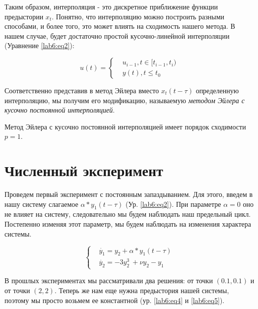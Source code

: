 Таким образом, интерполяция - это дискретное приближение
функции предыстории $x_t$. Понятно, что интерполяцию можно
построить разными способами, и более того, это может влиять
на сходимость нашего метода. В нашем случае, будет достаточно
простой кусочно-линейной интерполяции (Уравнение \ref{lab6:eq2}):

\begin{equation}\label{lab6:eq2}
    u(t) = \begin{cases}
        &u_{i-1}, t \in [t_{i-1}, t_i) \\
        &y(t), t \leq t_0
    \end{cases}
\end{equation}

Соответственно представив в метод Эйлера вместо $x_t(t - \tau)$
определенную интерполяцию, мы получим его модификацию, называемую
\textit{методом Эйлера с кусочно постоянной интерполяцией}.

\begin{theorem}
    Метод Эйлера с кусочно постоянной интерполяцией имеет порядок
    сходимости $p = 1$.
\end{theorem}



\section{Численный эксперимент}

Проведем первый эксперимент с постоянным запаздыванием.
Для этого, введем в нашу систему слагаемое
$\alpha * y_1(t-\tau)$ (Ур. \ref{lab6:eq2}). При параметре
$\alpha = 0$ оно не влияет на систему, следовательно мы будем
наблюдать наш предельный цикл. Постепенно изменяя этот параметр,
мы будем наблюдать на изменения характера системы.

\begin{equation}\label{lab6:eq3}
\begin{cases}
    &\dot{y_1} = y_2 + \alpha * y_1(t-\tau)\\
    &\dot{y_2} = -3y_2^3\ + \nu y_2 - y_1
\end{cases}
\end{equation}

В прошлых экспериментах мы рассматривали два решения: от точки
$(0.1, 0.1)$ и от точки $(2, 2)$. Теперь же нам еще нужна
предыстория нашей системы, поэтому мы просто возьмем ее константной
(ур. \ref{lab6:eq4} и \ref{lab6:eq5}).

